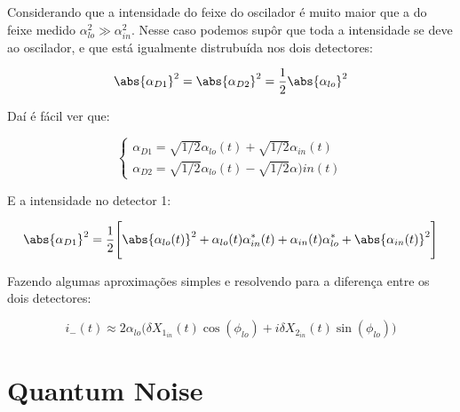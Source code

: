 Considerando que a intensidade do feixe do oscilador é muito maior que a do feixe medido $\alpha_{lo}^2\gg\alpha_{in}^2$. Nesse caso podemos supôr que toda a intensidade se deve ao oscilador, e que está igualmente distrubuída nos dois detectores:

\begin{equation}
    \abs{\alpha_{D1}}^2=\abs{\alpha_{D2}}^2=\frac{1}{2}\abs{\alpha_{lo}}^2
\end{equation}

Daí é fácil ver que:

\begin{equation}
    \begin{cases}
        \alpha_{D1}=\sqrt{1/2}\alpha_{lo}(t)+\sqrt{1/2}\alpha_{in}(t)\\
        \alpha_{D2}=\sqrt{1/2}\alpha_{lo}(t)-\sqrt{1/2}\alpha){in}(t)
    \end{cases}
\end{equation}

E a intensidade no detector 1:

\begin{equation}
    \abs{\alpha_{D1}}^2=\frac{1}{2}\Bigg[ \abs{\alpha_{lo}(t)}^2+\alpha_{lo}(t)\alpha^*_{in}(t)+\alpha_{in}(t)\alpha^*_{lo}+\abs{\alpha_{in}(t)}^2\Bigg]
\end{equation}

Fazendo algumas aproximações simples e resolvendo para a diferença entre os dois detectores:             

\begin{equation}
    i_{-}(t)\approx 2\alpha_{lo}\big(\delta X_1_{in}(t)\cos(\phi_{lo})+i\delta X_2_{in}(t)\sin(\phi_{lo})\big)
\end{equation}

\pagebreak

\section{Quantum Noise}

\pagebreak
